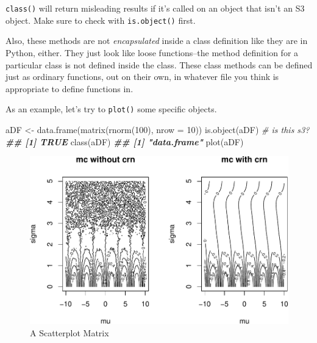 \documentclass[
  12pt,
  krantz2]{krantz}
\makeatletter
\newenvironment{Shaded}{\begin{snugshade}}{\end{snugshade}}
\newcommand{\AttributeTok}[1]{\textcolor[rgb]{0.61,0.61,0.61}{#1}}
\newcommand{\CommentTok}[1]{\textcolor[rgb]{0.37,0.37,0.37}{\textit{#1}}}
\newcommand{\DecValTok}[1]{\textcolor[rgb]{0.06,0.06,0.06}{#1}}
\newcommand{\DocumentationTok}[1]{\textcolor[rgb]{0.37,0.37,0.37}{\textbf{\textit{#1}}}}
\newcommand{\FunctionTok}[1]{\textcolor[rgb]{0,0,0}{#1}}
\newcommand{\NormalTok}[1]{#1}
\newcommand{\OtherTok}[1]{\textcolor[rgb]{0.37,0.37,0.37}{#1}}
\newenvironment{kframe}{%
\medskip{}
\setlength{\fboxsep}{.8em}
 \def\at@end@of@kframe{}%
 \ifinner\ifhmode%
  \def\at@end@of@kframe{\end{minipage}}%
  \begin{minipage}{\columnwidth}%
 \fi\fi%
 \def\FrameCommand##1{\hskip\@totalleftmargin \hskip-\fboxsep
 \colorbox{shadecolor}{##1}\hskip-\fboxsep
     \hskip-\linewidth \hskip-\@totalleftmargin \hskip\columnwidth}%
 \MakeFramed {\advance\hsize-\width
   \@totalleftmargin\z@ \linewidth\hsize
   \@setminipage}}%
 {\par\unskip\endMakeFramed%
 \at@end@of@kframe}
\renewenvironment{Shaded}{\begin{kframe}}{\end{kframe}}
\makeatother
\begin{document}
\begin{rmd-caution}
\texttt{class()} will return misleading results if it's called on an object that isn't an S3 object. Make sure to check with \texttt{is.object()} first.

\end{rmd-caution}

Also, these methods are not \emph{encapsulated} inside a class definition like they are in Python, either. They just look like loose functions--the method definition for a particular class is not defined inside the class. These class methods can be defined just as ordinary functions, out on their own, in whatever file you think is appropriate to define functions in.

As an example, let's try to \texttt{plot()} some specific objects.

\begin{Shaded}
\begin{Highlighting}[]
\NormalTok{aDF }\OtherTok{\textless{}{-}} \FunctionTok{data.frame}\NormalTok{(}\FunctionTok{matrix}\NormalTok{(}\FunctionTok{rnorm}\NormalTok{(}\DecValTok{100}\NormalTok{), }\AttributeTok{nrow =} \DecValTok{10}\NormalTok{))}
\FunctionTok{is.object}\NormalTok{(aDF) }\CommentTok{\# is this s3?}
\DocumentationTok{\#\# [1] TRUE}
\FunctionTok{class}\NormalTok{(aDF)}
\DocumentationTok{\#\# [1] "data.frame"}
\FunctionTok{plot}\NormalTok{(aDF)}
\end{Highlighting}
\end{Shaded}

\begin{figure}

{\centering \includegraphics[width=0.8\linewidth]{r_and_python_book_files/figure-latex/unnamed-chunk-244-1} 

}

\caption{A Scatterplot Matrix}\label{fig:unnamed-chunk-244}
\end{figure}
\end{document}
